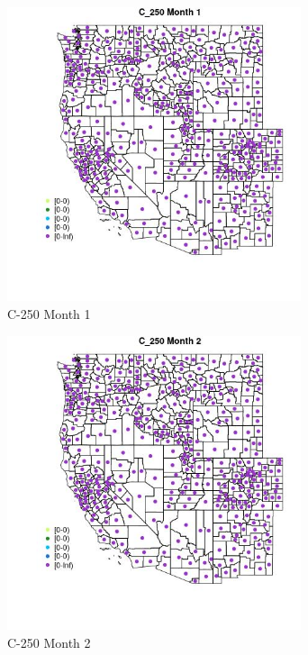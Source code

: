 \begin{figure} 
\centering  
\includegraphics[width=0.77\textwidth]{Code_Outputs/df_report_ML_predictors_CountyCentroid_Locations_Dates_2008-01-01to2018-12-31_MapObsMo1C_250.jpg} 
\caption{\label{fig:df_report_ML_predictors_CountyCentroid_Locations_Dates_2008-01-01to2018-12-31MapObsMo1C_250}C-250 Month 1} 
\end{figure} 
 

\begin{figure} 
\centering  
\includegraphics[width=0.77\textwidth]{Code_Outputs/df_report_ML_predictors_CountyCentroid_Locations_Dates_2008-01-01to2018-12-31_MapObsMo2C_250.jpg} 
\caption{\label{fig:df_report_ML_predictors_CountyCentroid_Locations_Dates_2008-01-01to2018-12-31MapObsMo2C_250}C-250 Month 2} 
\end{figure} 
 

